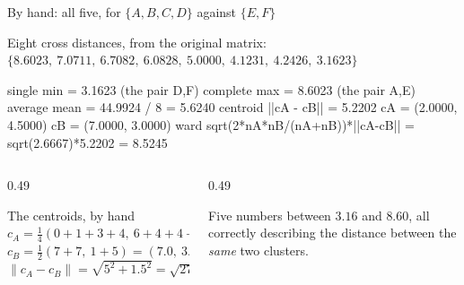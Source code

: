 \documentclass[aspectratio=169]{beamer}
\begin{document}
\begin{frame}[fragile,shrink=6]{By hand: all five, for $\{A,B,C,D\}$ against $\{E,F\}$}
  \begin{center}\small
    Eight cross distances, from the original matrix:
    $\{8.6023,\ 7.0711,\ 6.7082,\ 6.0828,\ 5.0000,\ 4.1231,\ 4.2426,\ 3.1623\}$
  \end{center}
\begin{outblk}
  single   min          = 3.1623                       (the pair D,F)
  complete max          = 8.6023                       (the pair A,E)
  average  mean         = 44.9924 / 8 = 5.6240
  centroid ||cA - cB||  = 5.2202   cA = (2.0000, 4.5000)  cB = (7.0000, 3.0000)
  ward     sqrt(2*nA*nB/(nA+nB))*||cA-cB|| = sqrt(2.6667)*5.2202 = 8.5245
\end{outblk}
  \vspace{0.2em}
  \begin{columns}[T]
    \begin{column}{0.49\textwidth}
      \begin{block}{The centroids, by hand}
        \small
        $c_A = \frac14(0{+}1{+}3{+}4,\ 6{+}4{+}4{+}4) = (2.0,\ 4.5)$\\
        $c_B = \frac12(7{+}7,\ 1{+}5) = (7.0,\ 3.0)$\\
        $\lVert c_A - c_B\rVert = \sqrt{5^2 + 1.5^2} = \sqrt{27.25} = 5.2202$
      \end{block}
    \end{column}
    \begin{column}{0.49\textwidth}
      \begin{alertblock}{}
        \centering
        Five numbers between $3.16$ and $8.60$, all correctly describing the
        distance between the \emph{same} two clusters.
      \end{alertblock}
    \end{column}
  \end{columns}
\end{frame}
\end{document}
